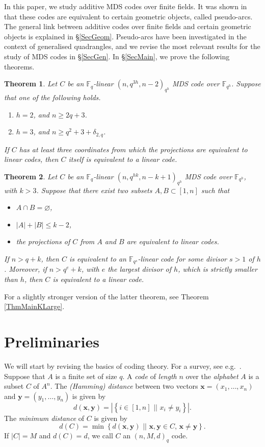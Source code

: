 \documentclass[a4paper]{article}
\newtheorem{thm}{Theorem}[section]
\theoremstyle{definition}
\newcommand{\FF}{\mathbb F}
\newcommand{\sett}[2]{ \left\{ #1 \, \, || \, \, #2 \right \} }
\newcommand{\xx}{\mathbf x}
\newcommand{\yy}{\mathbf y}
\begin{document}
In this paper, we study additive MDS codes over finite fields.
It was shown in \cite{gamboa} that these codes are equivalent to certain geometric objects, called pseudo-arcs.
The general link between additive codes over finite fields and certain geometric objects is explained in \S \ref{SecGeom}.
Pseudo-arcs have been investigated in the context of generalised quadrangles, and we revise the most relevant results for the study of MDS codes in \S \ref{SecGen}.
In \S \ref{SecMain}, we prove the following theorems.

\begin{thm}
 \label{ThmMainK=3}
 Let $C$ be an $\FF_q$-linear $(n,q^{3h},n-2)_{q^h}$ MDS code over $\FF_{q^h}$.
 Suppose that one of the following holds.
 \begin{enumerate}
  \item $h=2$, and $n \geq 2q+3$.
  \item $h=3$, and $n \geq q^2 + 3 + \delta_{2,q}$.
 \end{enumerate}
 If $C$ has at least three coordinates from which the projections are equivalent to linear codes, then $C$ itself is equivalent to a linear code.
\end{thm}

\begin{thm}
 \label{ThmMainKLargeIntro}
 Let $C$ be an $\FF_q$-linear $(n,q^{hk},n-k+1)_{q^h}$ MDS code over $\FF_{q^h}$, with $k > 3$.
 Suppose that there exist two subsets $A, B \subset [1,n]$ such that
 \begin{itemize}
  \item $A \cap B = \varnothing$,
  \item $|A| + |B| \leq k-2$,
  \item the projections of $C$ from $A$ and $B$ are equivalent to linear codes.
 \end{itemize}
 If $n > q+k$, then $C$ is equivalent to an $\FF_{q^s}$-linear code for some divisor $s > 1$ of $h$.
 Moreover, if $n > q^e+k$, with $e$ the largest divisor of $h$, which is strictly smaller than $h$, then $C$ is equivalent to a linear code.
\end{thm}

For a slightly stronger version of the latter theorem, see Theorem \ref{ThmMainKLarge}.


\section{Preliminaries}
 \label{SecPrel}

We will start by revising the basics of coding theory.
For a survey, see e.g.\ \cite{ball20}.
Suppose that $A$ is a finite set of size $q$.
A \emph{code} of \emph{length} $n$ over the \emph{alphabet} $A$ is a subset $C$ of $A^n$.
The \emph{(Hamming) distance} between two vectors $\xx = (x_1,\dots,x_n)$ and $\yy = (y_1,\dots,y_n)$ is given by
\[
 d(\xx,\yy) = |\sett{i \in [1,n]}{x_i \neq y_i}|.
\]
The \emph{minimum distance} of $C$ is given by
\[
 d(C) = \min \sett{d(\xx,\yy)}{\xx, \yy \in C, \, \xx \neq \yy}.
\]
If $|C| = M$ and $d(C) = d$, we call $C$ an $(n,M,d)_q$ code.
\end{document}
